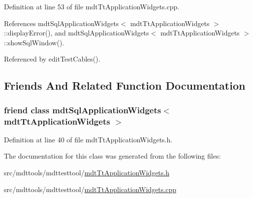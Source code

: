 Definition at line 53 of file mdt\-Tt\-Application\-Widgets.\-cpp.



References mdt\-Sql\-Application\-Widgets$<$ mdt\-Tt\-Application\-Widgets $>$\-::display\-Error(), and mdt\-Sql\-Application\-Widgets$<$ mdt\-Tt\-Application\-Widgets $>$\-::show\-Sql\-Window().



Referenced by edit\-Test\-Cables().



\subsection{Friends And Related Function Documentation}
\hypertarget{classmdt_tt_application_widgets_a772e66e9543a39645b5f5b3d37b8a461}{
\subsubsection[{mdt\-Sql\-Application\-Widgets$<$ mdt\-Tt\-Application\-Widgets $>$}]{\setlength{\rightskip}{0pt plus 5cm}friend class {\bf mdt\-Sql\-Application\-Widgets}$<$ {\bf mdt\-Tt\-Application\-Widgets} $>$\hspace{0.3cm}{\ttfamily [friend]}}}\label{classmdt_tt_application_widgets_a772e66e9543a39645b5f5b3d37b8a461}


Definition at line 40 of file mdt\-Tt\-Application\-Widgets.\-h.



The documentation for this class was generated from the following files\-:\begin{DoxyCompactItemize}
\item 
src/mdttools/mdttesttool/\hyperlink{mdt_tt_application_widgets_8h}{mdt\-Tt\-Application\-Widgets.\-h}\item 
src/mdttools/mdttesttool/\hyperlink{mdt_tt_application_widgets_8cpp}{mdt\-Tt\-Application\-Widgets.\-cpp}\end{DoxyCompactItemize}
